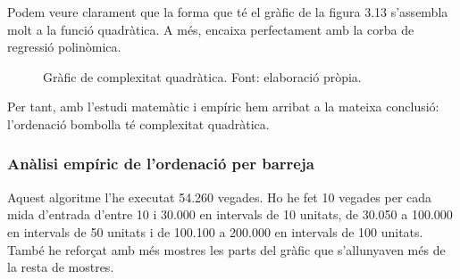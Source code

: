 Podem veure clarament que la forma que té el gràfic de la figura 3.13 s'assembla molt a la funció quadràtica. A més, encaixa perfectament amb la corba de regressió polinòmica.
\vspace{18pt}
\begin{figure}[H]
    \centering
{}
    \caption[Gràfic de complexitat quadràtica.]{Gràfic de complexitat quadràtica. Font: elaboració pròpia.}
    \label{fig:my_label}
\end{figure}

Per tant, amb l'estudi matemàtic i empíric hem arribat a la mateixa conclusió: l'ordenació bombolla té complexitat quadràtica.

\subsubsection{Anàlisi empíric de l'ordenació per barreja}
Aquest algoritme l'he executat 54.260 vegades. Ho he fet 10 vegades per cada mida d'entrada d'entre 10 i 30.000 en intervals de 10 unitats, de 30.050 a 100.000 en intervals de 50 unitats i de 100.100 a 200.000 en intervals de 100 unitats. També he reforçat amb més mostres les parts del gràfic que s'allunyaven més de la resta de mostres.

